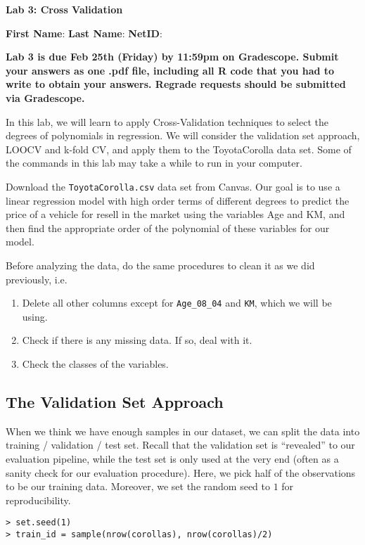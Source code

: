 \documentclass{article}
\begin{document}
        \begin{center}
                {\Large \bf Lab 3: Cross Validation}

                    \bigskip

                        {\bf First Name}: \underline{\hspace{2.5cm}}  {\bf Last Name}: \underline{\hspace{2.5cm}} {\bf NetID}: \underline{\hspace{2.5cm}}
                    \end{center}
\textbf{Lab 3 is due Feb 25th (Friday) by 11:59pm on Gradescope. Submit your answers
as one .pdf file, including all R code that you had to write to obtain your
answers. Regrade requests should be submitted via Gradescope.}

\bigskip

In this lab, we will learn to apply Cross-Validation techniques to select the
degrees of polynomials in regression. We will consider the validation set
approach, LOOCV and k-fold CV, and apply them to the ToyotaCorolla data set.
Some of the commands in this lab may take a while to run in your computer.
\bigskip

Download the \texttt{ToyotaCorolla.csv} data set from Canvas.  Our goal is to
use a linear regression model with high order terms of different degrees to
predict the price of a vehicle for resell in the market using the variables Age
and KM, and then find the appropriate order of the polynomial of these variables for
our model.
\bigskip

Before analyzing the data, do the same procedures to clean it as we did previously, i.e.
\begin{enumerate}
	\item Delete all other columns except for \texttt{Age\_08\_04} and \texttt{KM}, which we will be using.
	\item Check if there is any missing data. If so, deal with it.
	\item Check the classes of the variables.
\end{enumerate}

\subsection*{The Validation Set Approach}
When we think we have enough samples in our dataset, we can split the data into
training / validation / test set. Recall that the validation set is ``revealed''
to our evaluation pipeline, while the test set is only used at the very end
(often as a sanity check for our evaluation procedure). Here, we pick half of
the observations to be our training data. Moreover, we set the random seed to
$1$ for reproducibility.
\begin{Verbatim}[frame=single]
> set.seed(1)
> train_id = sample(nrow(corollas), nrow(corollas)/2)
\end{Verbatim}
\end{document}
